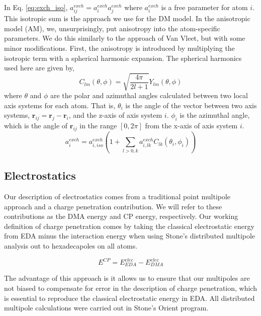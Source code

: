 \documentclass[journal=jacsat,manuscript=article]{achemso}
\begin{document}
In Eq. \ref{eq:exch_iso}, $a_{ij}^{exch}=a_{i}^{exch}a_{j}^{exch}$ where
$a_{i}^{exch}$ is a free parameter for atom $i$. This isotropic sum is the
approach we use for the DM model. In the anisotropic model (AM), we,
unsurprisingly, put anisotropy into the atom-specific parameters.
We do this similarly to the approach of Van Vleet, but with some minor
modifications\cite{van2018new}. First, the anisotropy is introduced by multiplying
the isotropic term with a spherical harmonic expansion. The spherical harmonics
used here are given by,
\begin{equation}
  C_{lm}(\theta,\phi)=\sqrt{\frac{4\pi}{2l+1}}Y_{lm}(\theta,\phi)
\end{equation}
where $\theta$ and $\phi$ are the polar and azimuthal angles
calculated between two local axis systems for each atom.\cite{bernardo1994anisotropic}
That is, $\theta_i$ is the angle of the vector between two axis systems,
$\mathbf{r}_{ij}=\mathbf{r}_j-\mathbf{r}_i$, and the z-axis of axis system $i$.
$\phi_i$ is the azimuthal angle, which is the angle of $\mathbf{r}_{ij}$ in the range $[0,2\pi]$ from the
x-axis of axis system $i$.
\begin{equation}
  a_i^{exch} = a_{i,iso}^{exch}\left(1 + \sum_{l>0,k}a_{i,lk}^{exch}C_{lk}(\theta_i,\phi_i)\right)
  \label{eq:exch_params_aniso}
\end{equation}

\subsection*{Electrostatics}

Our description of electrostatics comes from a traditional
point multipole approach and a charge penetration contribution. We will refer to
these contributions as the DMA energy and CP energy, respectively.
Our working definition of charge penetration comes by taking the
classical electrostatic energy from EDA minus the interaction energy
when using Stone's distributed multipole analysis\cite{stone1981distributed,stone1985distributed}
out to hexadecapoles on all atoms.

\begin{equation}
  E^{CP}=E^{elec}_{EDA}-E^{elec}_{DMA}
\end{equation}

The advantage of this approach is it allows us to ensure that
our multipoles are not biased to compensate for error in the
description of charge penetration, which is essential to reproduce
the classical electrostatic energy in EDA.
All distributed multipole calculations were carried out
in Stone's Orient program.\cite{stone2002orient}
\end{document}

